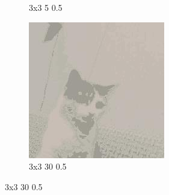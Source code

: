 \documentclass[12pt,a4paper]{article}
\begin{document}
\begin{figure}[htb]
\begin{subfigure}{0.25\textwidth}
  \caption{3x3 5 0.5}
  \label{fig:2}
\end{subfigure}\hfil %
\begin{subfigure}{0.25\textwidth}
  \includegraphics[width=\linewidth]{images/small/3-3-30-05}
  \caption{3x3 30 0.5}
  \label{fig:3}
\end{subfigure}


\end{figure}
\end{document}
